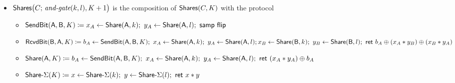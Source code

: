 \begin{itemize}
\item $\mathsf{Shares}\big(C; \, \textit{and-gate}(k,l),K+1\big)$ is the composition of $\mathsf{Shares}(C,K)$ with the protocol
\begin{itemize}
\item $\SendBit(\A,\B,K) \coloneqq x_A \leftarrow \Share(\A,k); \ y_A \leftarrow \Share(\A,l); \ \samp{\flip}$
\item $\mathsf{RcvdBit}(\mathsf{B},\mathsf{A},K) \coloneqq b_A \leftarrow \mathsf{SendBit}(\mathsf{A},\mathsf{B},K); \ x_A \leftarrow \mathsf{Share}(\mathsf{A},k); \ y_A \leftarrow \mathsf{Share}(\mathsf{A},l); \\ x_B \leftarrow \mathsf{Share}(\mathsf{B},k); \ y_B \leftarrow \mathsf{Share}(\mathsf{B},l); \ \mathsf{ret} \ b_A \oplus (x_A * y_B) \oplus (x_B * y_A)$
\item $\mathsf{Share}(\mathsf{A},K) \coloneqq b_A \leftarrow \mathsf{SendBit}(\mathsf{A},\mathsf{B},K); \ x_A \leftarrow \mathsf{Share}(\mathsf{A},k); \ y_A \leftarrow \mathsf{Share}(\mathsf{A},l); \ \mathsf{ret} \ (x_A * y_A) \oplus b_A$
\item $\mathsf{Share}\textsf{-}\Sigma(K) \coloneqq x \leftarrow \mathsf{Share}\textsf{-}\Sigma(k); \ y \leftarrow \mathsf{Share}\textsf{-}\Sigma(l); \ \mathsf{ret} \ x * y$
\end{itemize}
\end{itemize}

